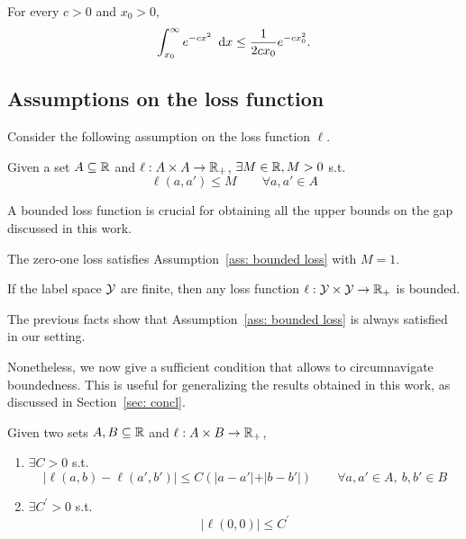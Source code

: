 \documentclass[reqno]{amsart}
\begin{document}
\begin{proposition}\label{app: gtailbound}
  For every $c>0$ and $x_0>0$,
  \[
  \int_{x_0}^\infty e^{-cx^2}\mathop{}\!\,\,\mathrm{d} x \le \frac{1}{2cx_0}e^{-cx_0^2}.
  \]
\end{proposition}

\subsection{Assumptions on the loss function}

Consider the following assumption on the loss function $\ell$. 

\begin{assumption}\label{ass: bounded loss}
    Given a set $A\subseteq\mathbb{R}$ and $\ell:A\times A\to\mathbb{R}_+$,
    $\exists M\in\mathbb{R}, M >0$ s.t.
    \[
    \ell (a,a') \le M \qquad \forall a,a'\in A 
    \]
\end{assumption}

A bounded loss function is crucial for obtaining all the upper bounds on the gap discussed in this work. 

\begin{fact}
    The zero-one loss satisfies Assumption~\ref{ass: bounded loss} with $M=1$.
\end{fact}

\begin{fact}
  If the label space $\mathcal{Y}$ are finite, then any loss function $\ell:\mathcal{Y}\times\mathcal{Y}\to\mathbb{R}_+$ is bounded.  
\end{fact}

The previous facts show that Assumption~\ref{ass: bounded loss} is always satisfied in our setting. 

Nonetheless, we now give a sufficient condition that allows to circumnavigate boundedness. This is useful for generalizing the results obtained in this work, as discussed in Section~\ref{sec: concl}.  

\begin{assumption}\label{ass: lipsch loss}
Given two sets $A,B\subseteq\mathbb{R}$ and $\ell:A\times B\to\mathbb{R}_+$, 
    \begin{enumerate}
        \item $\exists C>0$ s.t.
        \[ \vert \ell(a,b)-\ell(a',b')\vert \le C\left(\vert a-a'\vert + \vert b-b'\vert\right) \qquad \forall a,a'\in A,\ b,b' \in B\]

        \item $\exists C^\prime >0$ s.t.
        \[ \vert \ell(0,0)\vert \le C^\prime
        \]
    \end{enumerate}
\end{assumption}
\end{document}
